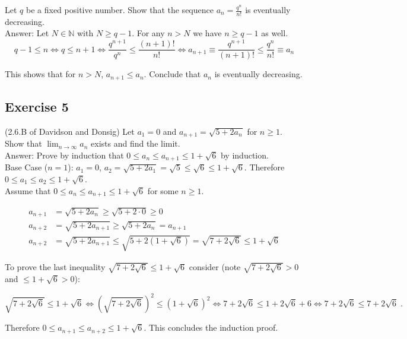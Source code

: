 \documentclass{article}
\begin{document}
Let $q$ be a fixed positive number. Show that the sequence $a_n = \frac{q^n}{n!}$ is eventually decreasing. \\

Answer: Let $N \in \mathbb{N}$ with $N \geq q-1$. For any $n > N$ we have $n \geq q-1$ as well.
$$
q-1 \leq n \iff q \leq n+1 \iff \frac{q^{n+1}}{q^n}\leq \frac{(n+1)!}{n!} \iff a_{n+1} \equiv \frac{q^{n+1}}{(n+1)!} \leq \frac{q^n}{n!} \equiv a_n
$$

This shows that for $n > N$, $a_{n+1} \leq a_n$. Conclude that $a_n$ is eventually decreasing. 

\newpage

\subsection*{Exercise 5}

(2.6.B of Davidson and Donsig) Let $a_1 = 0$ and $a_{n+1} = \sqrt{5+2a_n}$ for $n\geq 1$. Show that $\lim_{n\rightarrow \infty} a_n$ exists and find the limit. \\

Answer: Prove by induction that $0 \leq a_n \leq a_{n+1} \leq 1+\sqrt{6}$ by induction. \\

Base Case ($n=1$): $a_1 = 0$, $a_2 = \sqrt{5+2a_1} = \sqrt{5} \leq \sqrt{6} \leq 1+\sqrt{6}$. Therefore $0\leq a_1 \leq a_2 \leq 1+\sqrt{6}$. \\

Assume that $0\leq a_n \leq a_{n+1} \leq 1+\sqrt{6}$ for some $n \geq 1$.

\begin{align*}
a_{n+1} &= \sqrt{5+2a_n} \geq \sqrt{5+2\cdot 0} \geq 0 \\
a_{n+2} &= \sqrt{5+2a_{n+1}} \geq \sqrt{5+2a_n} = a_{n+1} \\
a_{n+2} &= \sqrt{5+2a_{n+1}} \leq \sqrt{5+2(1+\sqrt{6})} = \sqrt{7+2\sqrt{6}} \leq 1+\sqrt{6}
\end{align*}

To prove the last inequality $\sqrt{7+2\sqrt{6}} \leq 1+\sqrt{6}$ consider (note $\sqrt{7+2\sqrt{6}} > 0$ and  $\leq 1+\sqrt{6} > 0$):

$$
\sqrt{7+2\sqrt{6}} \leq 1+\sqrt{6} \iff \left(\sqrt{7+2\sqrt{6}}\right)^2 \leq (1+\sqrt{6})^2 \iff 7+2\sqrt{6} \leq 1 + 2\sqrt{6} + 6 \iff 7 + 2\sqrt{6} \leq 7 + 2\sqrt{6} \;.
$$

Therefore $0 \leq a_{n+1} \leq a_{n+2} \leq 1+\sqrt{6}$. This concludes the induction proof.
\end{document}
